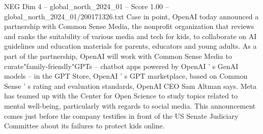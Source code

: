 \begin{textsample}{NEG Dim 4 – global\_north\_2024\_01 – Score 1.00 – global\_north\_2024\_01/200171326.txt}
Case in point, OpenAI today announced a partnership with Common Sense Media, the nonprofit organization that reviews and ranks the suitability of various media and tech for kids, to collaborate on AI guidelines and education materials for parents, educators and young adults.
As a part of the partnership, OpenAI will work with Common Sense Media to curate"family-friendly"GPTs -- chatbot apps powered by OpenAI ' s GenAI models -- in the GPT Store, OpenAI ' s GPT marketplace, based on Common Sense ' s rating and evaluation standards, OpenAI CEO Sam Altman says.
Meta has teamed up with the Center for Open Science to study topics related to mental well-being, particularly with regards to social media.
This announcement comes just before the company testifies in front of the US Senate Judiciary Committee about its failures to protect kids online.

\end{textsample}
